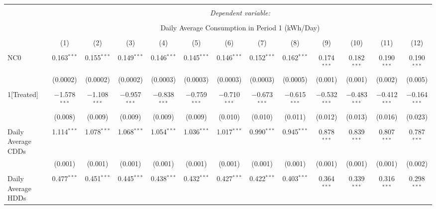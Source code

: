 
\begin{table}[!htbp] \centering 
  \caption{} 
  \label{} 
\small 
\begin{tabular}{@{\extracolsep{5pt}}lcccccccccccc} 
\\[-1.8ex]\hline 
\hline \\[-1.8ex] 
 & \multicolumn{12}{c}{\textit{Dependent variable:}} \\ 
\cline{2-13} 
\\[-1.8ex] & \multicolumn{12}{c}{Daily Average Consumption in Period 1 (kWh/Day)} \\ 
\\[-1.8ex] & (1) & (2) & (3) & (4) & (5) & (6) & (7) & (8) & (9) & (10) & (11) & (12)\\ 
\hline \\[-1.8ex] 
 NC0 & 0.163$^{***}$ & 0.155$^{***}$ & 0.149$^{***}$ & 0.146$^{***}$ & 0.145$^{***}$ & 0.146$^{***}$ & 0.152$^{***}$ & 0.162$^{***}$ & 0.174$^{***}$ & 0.182$^{***}$ & 0.190$^{***}$ & 0.190$^{***}$ \\ 
  & (0.0002) & (0.0002) & (0.0002) & (0.0003) & (0.0003) & (0.0003) & (0.0003) & (0.0005) & (0.001) & (0.001) & (0.002) & (0.005) \\ 
  & & & & & & & & & & & & \\ 
 1[Treated] & $-$1.578$^{***}$ & $-$1.108$^{***}$ & $-$0.957$^{***}$ & $-$0.838$^{***}$ & $-$0.759$^{***}$ & $-$0.710$^{***}$ & $-$0.673$^{***}$ & $-$0.615$^{***}$ & $-$0.532$^{***}$ & $-$0.483$^{***}$ & $-$0.412$^{***}$ & $-$0.164$^{***}$ \\ 
  & (0.008) & (0.009) & (0.009) & (0.009) & (0.009) & (0.010) & (0.010) & (0.011) & (0.012) & (0.013) & (0.016) & (0.023) \\ 
  & & & & & & & & & & & & \\ 
 Daily Average CDDs & 1.114$^{***}$ & 1.078$^{***}$ & 1.068$^{***}$ & 1.054$^{***}$ & 1.036$^{***}$ & 1.017$^{***}$ & 0.990$^{***}$ & 0.945$^{***}$ & 0.878$^{***}$ & 0.839$^{***}$ & 0.807$^{***}$ & 0.787$^{***}$ \\ 
  & (0.001) & (0.001) & (0.001) & (0.001) & (0.001) & (0.001) & (0.001) & (0.001) & (0.001) & (0.001) & (0.001) & (0.002) \\ 
  & & & & & & & & & & & & \\ 
 Daily Average HDDs & 0.477$^{***}$ & 0.451$^{***}$ & 0.445$^{***}$ & 0.438$^{***}$ & 0.432$^{***}$ & 0.427$^{***}$ & 0.422$^{***}$ & 0.403$^{***}$ & 0.364$^{***}$ & 0.339$^{***}$ & 0.316$^{***}$ & 0.298$^{***}$ \\ 

\end{tabular}
\end{table}
